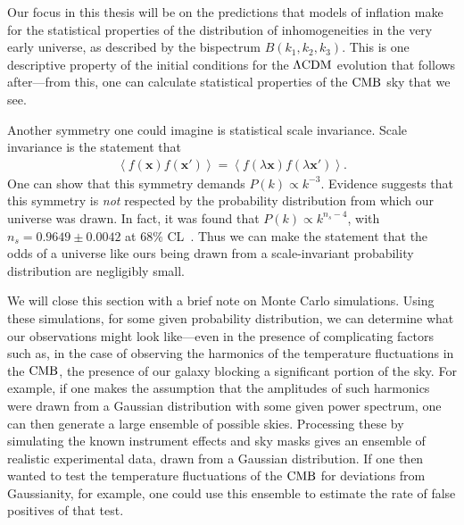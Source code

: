     Our focus in this thesis will be on the predictions that models of inflation make
    for the statistical properties of the distribution of
    inhomogeneities in the very early universe, as described by the bispectrum $B(k_1,k_2,k_3)$.
    This is one descriptive property of 
    the initial conditions for the $\Lambda\text{CDM}$ evolution that follows after---from
    this, one can calculate statistical properties of the $\text{CMB}$ sky that we see.


    Another symmetry one could imagine is statistical scale invariance.
    Scale invariance is the statement that
    \begin{align}
        \left<f(\mathbf{x})f(\mathbf{x'})\right> = \left<f(\lambda\mathbf{x})f(\lambda\mathbf{x'})\right>.
    \end{align}
    One can show that this symmetry demands $P(k)\propto k^{-3}$.
    Evidence suggests that this symmetry is \textit{not} respected by the probability
    distribution from which our universe was drawn.
    In fact, it was found that $P(k)\propto k^{n_s-4}$, with $n_s=0.9649 \pm 0.0042$
    at $68\%$ CL~\cite{Planck_inflation_2015, Planck_inflation_2018}.
    Thus we can make the statement that
    the odds of a universe like ours being drawn from a scale-invariant probability
    distribution are negligibly small.


    We will close this section with a brief note on Monte Carlo simulations.
    Using these simulations, for some given probability distribution, we can determine
    what our observations might look like---even in the presence of
    complicating factors such as, in the case of observing the harmonics of the temperature fluctuations
    in the $\text{CMB}$, the presence of our galaxy blocking a significant portion
    of the sky.
    For example, if one makes the assumption that the amplitudes of
    such harmonics were drawn from a Gaussian distribution with some given power spectrum,
    one can then generate a large ensemble of possible skies.
    Processing these by simulating the known instrument effects and
    sky masks gives an ensemble of realistic experimental data, drawn
    from a Gaussian distribution. If one then wanted to test the temperature
    fluctuations of the $\text{CMB}$ for deviations from Gaussianity,
    for example, one could use this ensemble to estimate the rate of false positives
    of that test.


